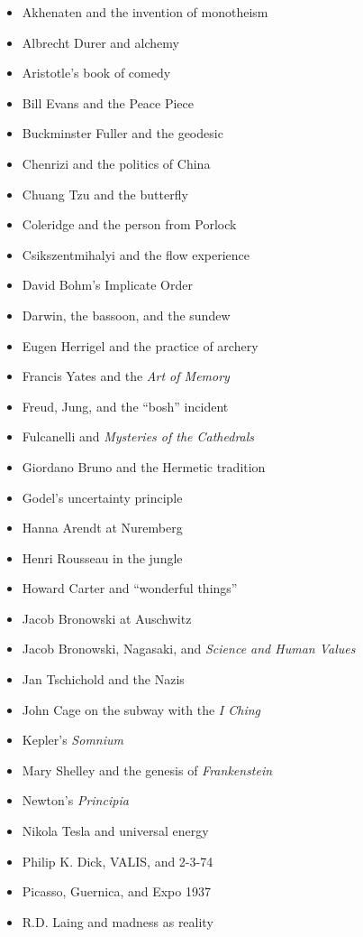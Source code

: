 \documentclass[letterpaper,oneside,11pt,draft]{memoir}
\begin{document}
\begin{itemize}
\item Akhenaten and the invention of monotheism
\item Albrecht Durer and alchemy
\item Aristotle's book of comedy
\item Bill Evans and the Peace Piece
\item Buckminster Fuller and the geodesic
\item Chenrizi and the politics of China
\item Chuang Tzu and the butterfly
\item Coleridge and the person from Porlock
\item Csikszentmihalyi and the flow experience
\item David Bohm's Implicate Order
\item Darwin, the bassoon, and the sundew
\item Eugen Herrigel and the practice of archery
\item Francis Yates and the \textit{Art of Memory}
\item Freud, Jung, and the ``bosh'' incident
\item Fulcanelli and \textit{Mysteries of the Cathedrals}
\item Giordano Bruno and the Hermetic tradition
\item Godel's uncertainty principle
\item Hanna Arendt at Nuremberg
\item Henri Rousseau in the jungle
\item Howard Carter and ``wonderful things''
\item Jacob Bronowski at Auschwitz
\item Jacob Bronowski, Nagasaki, and \textit{Science and Human Values}
\item Jan Tschichold and the Nazis
\item John Cage on the subway with the \textit{I Ching}
\item Kepler's \textit{Somnium}
\item Mary Shelley and the genesis of \textit{Frankenstein}
\item Newton's \textit{Principia}
\item Nikola Tesla and universal energy
\item Philip K. Dick, VALIS, and 2-3-74
\item Picasso, Guernica, and Expo 1937
\item R.D. Laing and madness as reality

\end{itemize}
\end{document}
